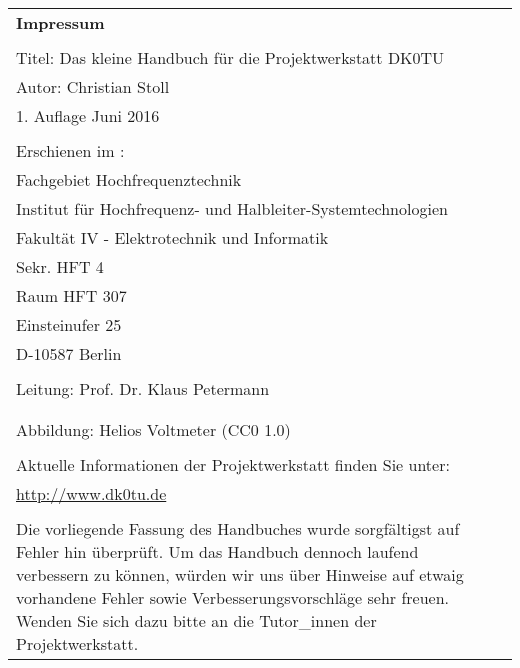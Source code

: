 \thispagestyle{empty}

\begin{tabular}{p{13cm} p{1cm}}
\textbf{Impressum} &\\
&\\
Titel: Das kleine Handbuch für die Projektwerkstatt DK0TU&\\
Autor: Christian Stoll&\\
1. Auflage Juni 2016 &\\
&\\
Erschienen im :&\\
Fachgebiet Hochfrequenztechnik &\\
Institut für Hochfrequenz- und Halbleiter-Systemtechnologien&\\
Fakultät IV - Elektrotechnik und Informatik &\\
Sekr. HFT 4 &\\
Raum HFT 307 &\\
Einsteinufer 25 &\\
D-10587 Berlin &\\
&\\
Leitung: Prof. Dr. Klaus Petermann &\\
&\\
&\\
Abbildung: Helios Voltmeter (CC0 1.0) \citep[][]{helios}&\\
&\\
Aktuelle Informationen der Projektwerkstatt finden Sie unter:  &\\
\url{http://www.dk0tu.de} &\\
&\\
Die vorliegende Fassung des Handbuches wurde sorgfältigst auf Fehler hin überprüft. Um das Handbuch dennoch laufend verbessern zu können, würden wir uns über Hinweise auf etwaig vorhandene Fehler sowie Verbesserungsvorschläge sehr freuen. Wenden Sie sich dazu bitte an die Tutor\_innen der Projektwerkstatt. &\\
\end{tabular}



